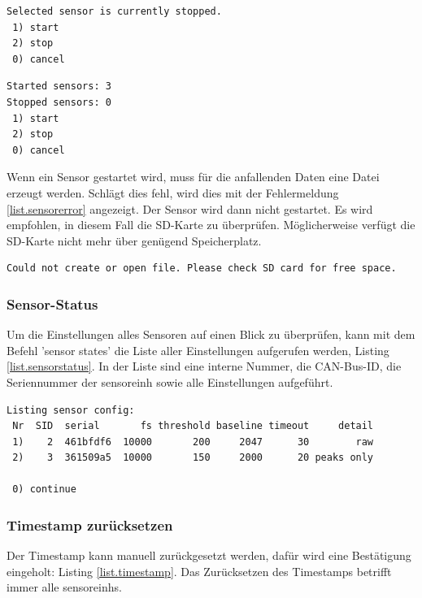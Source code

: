 \begin{lstlisting}[caption=Untermenü Start/Stop einzeln, label=list.started_one]
Selected sensor is currently stopped.
 1) start
 2) stop
 0) cancel
\end{lstlisting}

\begin{lstlisting}[caption=Untermenü Start/Stop alle Sensoren, label=list.started_all]
Started sensors: 3
Stopped sensors: 0
 1) start
 2) stop
 0) cancel
\end{lstlisting}

Wenn ein Sensor gestartet wird, muss für die anfallenden Daten eine Datei erzeugt werden. Schlägt dies fehl, wird dies mit der Fehlermeldung \ref{list.sensorerror} angezeigt. Der Sensor wird dann nicht gestartet. Es wird empfohlen, in diesem Fall die SD-Karte zu überprüfen. Möglicherweise verfügt die SD-Karte nicht mehr über genügend Speicherplatz.

\begin{lstlisting}[caption=Fehlermeldung beim Starten eines Sensors, label=list.sensorerror]
Could not create or open file. Please check SD card for free space.
\end{lstlisting}

\subsubsection{Sensor-Status}\label{sssec.sensorstate}
Um die Einstellungen alles Sensoren auf einen Blick zu überprüfen, kann mit dem Befehl 'sensor states' die Liste aller Einstellungen aufgerufen werden, Listing \ref{list.sensorstatus}. In der Liste sind eine interne Nummer, die CAN-Bus-ID, die Seriennummer der \gls{sensoreinh} sowie alle Einstellungen aufgeführt.

\begin{lstlisting}[caption=Untermenü Sensor-Status, label=list.sensorstatus]
Listing sensor config:
 Nr  SID  serial       fs threshold baseline timeout     detail
 1)    2  461bfdf6  10000       200     2047      30        raw
 2)    3  361509a5  10000       150     2000      20 peaks only
 
 0) continue
\end{lstlisting}


\subsubsection{Timestamp zurücksetzen}\label{sssec.timestamp}
Der Timestamp kann manuell zurückgesetzt werden, dafür wird eine Bestätigung eingeholt: Listing \ref{list.timestamp}. Das Zurücksetzen des Timestamps betrifft immer alle \glspl{sensoreinh}.


